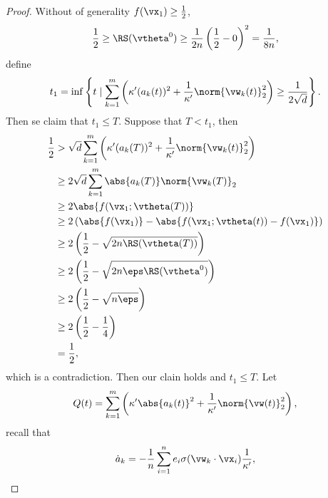 \documentclass{article}
\begin{document}
\begin{proof}
    Without of generality $f(\vx_1)\geq\frac{1}{2}$,
    \begin{equation}
        \frac{1}{2}\geq\RS(\vtheta^0)\geq\frac{1}{2n}\left(\frac{1}{2}-0\right)^2=\frac{1}{8n},
    \end{equation}
    define
    \begin{equation}
        t_1=\inf\left\{t\mid \sum_{k=1}^m\left(\kappa'(a_k(t))^2+\frac{1}{\kappa'}\norm{\vw_k(t)}^2_2\right)\geq\frac{1}{2\sqrt{d}}\right\}.
    \end{equation}
    Then se claim that $t_1\leq T$. Suppose that $T<t_1$, then
    \begin{equation}
        \begin{aligned}
            \frac{1}{2}
             & > \sqrt{d}\sum_{k=1}^m\left(\kappa'(a_k(T))^2+\frac{1}{\kappa'}\norm{\vw_k(t)}_2^2\right) \\
             & \geq 2\sqrt{d}\sum_{k=1}^m \abs{a_k(T)}\norm{\vw_k(T)}_2                                  \\
             & \geq 2\abs{f(\vx_1;\vtheta(T))}                                                           \\
             & \geq 2\left(\abs{f(\vx_1)}-\abs{f(\vx_1;\vtheta(t))-f(\vx_1)}\right)                      \\
             & \geq 2\left(\frac{1}{2}-\sqrt{2n\RS(\vtheta(T))}\right)                                   \\
             & \geq2\left(\frac{1}{2}-\sqrt{2n\eps\RS(\vtheta^0)}\right)                                 \\
             & \geq 2\left(\frac{1}{2}-\sqrt{n\eps}\right)                                               \\
             & \geq 2\left(\frac{1}{2}-\frac{1}{4}\right)                                                \\
             & = \frac{1}{2},
        \end{aligned}
    \end{equation}
    which is a contradiction. Then our clain holds and $t_1\leq T$. Let
    \begin{equation}
        Q(t)=\sum_{k=1}^m\left(\kappa'\abs{a_k(t)}^2+\frac{1}{\kappa'}\norm{\vw(t)}_2^2\right),
    \end{equation}
    recall that
    \begin{equation}
        \begin{aligned}
            \dot{a}_k   & = -\frac{1}{n}\sum_{i=1}^n e_i\sigma(\vw_k\cdot\vx_i)\frac{1}{\kappa'}, \\

\end{aligned}
\end{equation}
\end{proof}
\end{document}
